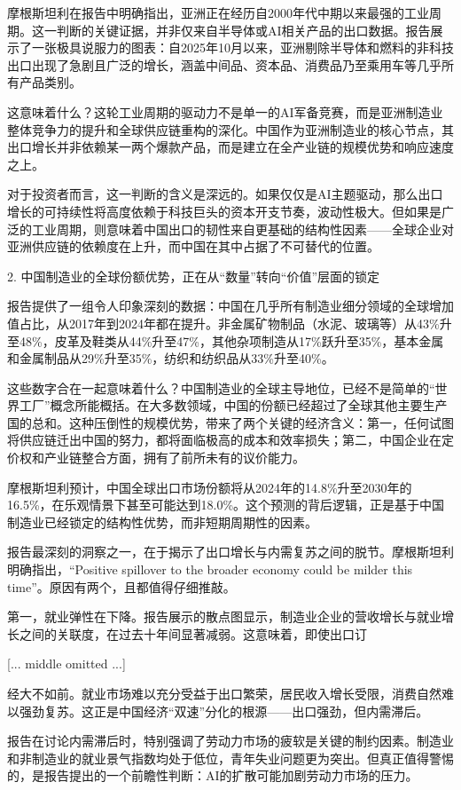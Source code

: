 \documentclass[11pt]{ctexart}
\begin{document}
摩根斯坦利在报告中明确指出，亚洲正在经历自2000年代中期以来最强的工业周期。这一判断的关键证据，并非仅来自半导体或AI相关产品的出口数据。报告展示了一张极具说服力的图表：自2025年10月以来，亚洲剔除半导体和燃料的非科技出口出现了急剧且广泛的增长，涵盖中间品、资本品、消费品乃至乘用车等几乎所有产品类别。

这意味着什么？这轮工业周期的驱动力不是单一的AI军备竞赛，而是亚洲制造业整体竞争力的提升和全球供应链重构的深化。中国作为亚洲制造业的核心节点，其出口增长并非依赖某一两个爆款产品，而是建立在全产业链的规模优势和响应速度之上。

对于投资者而言，这一判断的含义是深远的。如果仅仅是AI主题驱动，那么出口增长的可持续性将高度依赖于科技巨头的资本开支节奏，波动性极大。但如果是广泛的工业周期，则意味着中国出口的韧性来自更基础的结构性因素——全球企业对亚洲供应链的依赖度在上升，而中国在其中占据了不可替代的位置。

2. 中国制造业的全球份额优势，正在从“数量”转向“价值”层面的锁定

报告提供了一组令人印象深刻的数据：中国在几乎所有制造业细分领域的全球增加值占比，从2017年到2024年都在提升。非金属矿物制品（水泥、玻璃等）从43\%升至48\%，皮革及鞋类从44\%升至47\%，其他杂项制造从17\%跃升至35\%，基本金属和金属制品从29\%升至35\%，纺织和纺织品从33\%升至40\%。

这些数字合在一起意味着什么？中国制造业的全球主导地位，已经不是简单的“世界工厂”概念所能概括。在大多数领域，中国的份额已经超过了全球其他主要生产国的总和。这种压倒性的规模优势，带来了两个关键的经济含义：第一，任何试图将供应链迁出中国的努力，都将面临极高的成本和效率损失；第二，中国企业在定价权和产业链整合方面，拥有了前所未有的议价能力。

摩根斯坦利预计，中国全球出口市场份额将从2024年的14.8\%升至2030年的16.5\%，在乐观情景下甚至可能达到18.0\%。这个预测的背后逻辑，正是基于中国制造业已经锁定的结构性优势，而非短期周期性的因素。

报告最深刻的洞察之一，在于揭示了出口增长与内需复苏之间的脱节。摩根斯坦利明确指出，“Positive spillover to the broader economy could be milder this time”。原因有两个，且都值得仔细推敲。

第一，就业弹性在下降。报告展示的散点图显示，制造业企业的营收增长与就业增长之间的关联度，在过去十年间显著减弱。这意味着，即使出口订

[... middle omitted ...]

经大不如前。就业市场难以充分受益于出口繁荣，居民收入增长受限，消费自然难以强劲复苏。这正是中国经济“双速”分化的根源——出口强劲，但内需滞后。

报告在讨论内需滞后时，特别强调了劳动力市场的疲软是关键的制约因素。制造业和非制造业的就业景气指数均处于低位，青年失业问题更为突出。但真正值得警惕的，是报告提出的一个前瞻性判断：AI的扩散可能加剧劳动力市场的压力。
\end{document}
